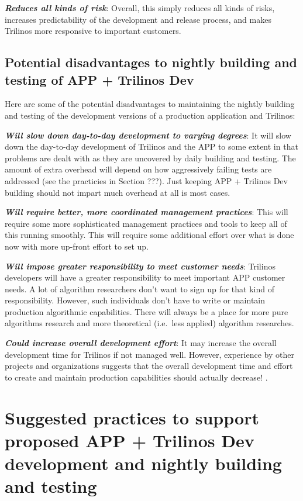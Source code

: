 \documentclass[pdf,ps2pdf,11pt]{SANDreport}
\begin{document}
{}\textit{\textbf{Reduces all kinds of risk}}: Overall, this simply reduces all
kinds of risks, increases predictability of the development and release
process, and makes Trilinos more responsive to important customers.


%
{}\subsection{Potential disadvantages to nightly building and testing of APP +
Trilinos Dev}
%

Here are some of the potential disadvantages to maintaining the nightly
building and testing of the development versions of a production application
and Trilinos:

{}\textit{\textbf{Will slow down day-to-day development to varying degrees}}:
It will slow down the day-to-day development of Trilinos and the APP to some
extent in that problems are dealt with as they are uncovered by daily building
and testing.  The amount of extra overhead will depend on how aggressively
failing tests are addressed (see the practicies in Section ???).  Just keeping
APP + Trilinos Dev building should not impart much overhead at all is most
cases.

{}\textit{\textbf{Will require better, more coordinated management practices}}:
This will require some more sophisticated management practices and tools to
keep all of this running smoothly.  This will require some additional effort
over what is done now with more up-front effort to set up.

{}\textit{\textbf{Will impose greater responsibility to meet customer needs}}:
Trilinos developers will have a greater responsibility to meet important APP
customer needs.  A lot of algorithm researchers don't want to sign up for that
kind of responsibility.  However, such individuals don't have to write or
maintain production algorithmic capabilities.  There will always be a place
for more pure algorithms research and more theoretical (i.e.\ less applied)
algorithm researches.

{}\textit{\textbf{Could increase overall development effort}}: It may increase the
overall development time for Trilinos if not managed well.  However,
experience by other projects and organizations suggests that the overall
development time and effort to create and maintain production capabilities
should actually decrease! {}\cite{book:code-complete-2}.


%
{}\section{Suggested practices to support proposed APP + Trilinos Dev
development and nightly building and testing}
\label{sec:suggested-practices}
%
\end{document}

